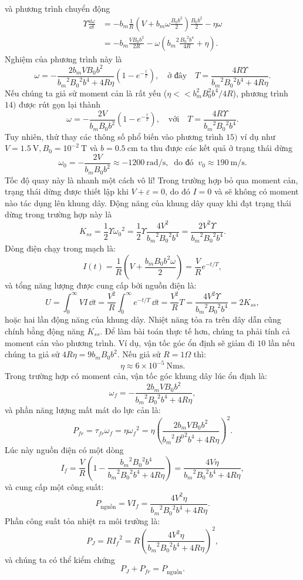 \begin{loigiai}
và phương trình chuyển động 
    \[\begin{aligned} \Upsilon \frac{\dd \omega}{\dd t} &= -b_m \frac{1}{R} \left(V + b_m \omega \frac{B_0 b^2}{2} \right) \frac{B_0 b^2}{2} -\eta \omega\\
      &= -b_m \frac{VB_0 b^2}{2R} - \omega\left({b_m}^2\frac{{B_0}^2 b^4}{4R} + \eta\right). \end{aligned} \tag{13} \]
Nghiệm của phương trình này là
      \[\omega= - \frac{2b_mVB_0 b^2}{{b_m}^2{B_0}^2 b^4 + 4R\eta}( 1- e^{-\frac{t}{T}}) ,  \quad   \text{ở đây}   \quad T= \frac{4R \Upsilon}{{b_m}^2 {B_0}^2b^4 +4R\eta}. \tag{14} \] 
Nếu chúng ta giả sử moment cản là rất yếu ($\eta << b_m^2 B_0^2 b^4/4R$), phương trình $14)$ được rút gọn lại thành 
     \[\omega = - \frac{2V}{b_m B_0 b^2}( 1 - e^{-\frac{t}{T}}),\quad \text{với} \quad T= \frac{4R\Upsilon}{{b_m}^2 {B_0}^2 b^4}. \tag{15} \]
Tuy nhiên, thử thay các thông số phổ biến vào phương trình $15)$ ví dụ như $V= 1.5 ~\mathrm{V}, B_0 = 10^{-2}~\mathrm{T}$ và $b=0.5~\mathrm{cm}$ ta thu được các kết quả ở trạng thái dừng
       \[ \omega_0 = -\frac{2V}{b_m B_0 b^2} \approx -1200 ~\mathrm{rad/s,}\ \text{ do đó }\ v_0 \approx 190 ~\mathrm{m/s}. \tag{16} \]
Tốc độ quay này là nhanh một cách vô lí! Trong trường hợp bỏ qua moment cản, trạng thái dừng được thiết lập khi $V+\varepsilon =0 $, do đó $I=0$ và sẽ không có moment nào tác dụng lên khung dây. Động năng của khung dây quay khi đạt trạng thái dừng trong trường hợp này là 
   \[K_{ss} =\frac{1}{2} \Upsilon {\omega_0}^2 = \frac{1}{2} \Upsilon \frac{4V^2}{{b_m}^2 {B_0}^2 b^4}= \frac{2V^2 \Upsilon}{{b_m}^2 {B_0}^2b^4} . \tag{17} \]
Dòng điện chạy trong mạch là: 
     \[ I(t) = \frac{1}{R} \left(V + \frac{b_m B_0 b^2 \omega}{2}\right) = \frac{V}{R}e^{-t/T}, \tag {18} \]
và tổng năng lượng được cung cấp bởi nguồn điện là:
     \[ U= \int_{0}^{\infty} VI \, \dd t = \frac{V^2}{R} \int_{0}^{\infty} e^{-t/T} \, \dd t = \frac{V^2}{R} T = \frac{4V^2 \Upsilon}{{b_m}^2 {B_0}^2 b^4 } = 2K_{ss}, \tag{19} \]
hoặc hai lần động năng của khung dây. Nhiệt năng tỏa ra trên dây dẫn cũng chính bằng động năng $K_{ss}$. Để làm bài toán thực tế hơn, chúng ta phải tính cả moment cản vào phương trình. Ví dụ, vận tốc góc ổn định sẽ giảm đi $10$ lần nếu chúng ta giả sử $4R\eta = 9b_m B_0 b^2$. Nếu giả sử $R  =1 \Omega $ thì:
     \[\eta \approx 6 \times 10^{-5} ~\mathrm{Nms}. \tag{20}\]
Trong trường hợp có moment cản, vận tốc góc khung dây lúc ổn định là: 
     \[ \omega_f = - \frac{2b_m V B_0 b^2}{{b_m}^2{B_0}^2 b^4 + 4R\eta}, \tag{21}\]
và phần năng lượng mất mát do lực cản là:
   \[P_{fr}=\tau_{fr}\omega_f = \eta {\omega_f}^2 =\eta \left( \frac{2b_m V B_0 b^2}{{b_m}^2 {B^0}^2 b^4 + 4R\eta}\right)^2. \tag{22}\]
Lúc này nguồn điện có một dòng 
    \[I_f = \frac{V}{R}\left(1 - \frac{{b_m}^2 {B_0}^2 b^4}{{b_m}^2 {B_0}^2 b^4 + 4R\eta}\right) = \frac{4V\eta}{{b_m}^2{B_0}^2 b^4 +4R\eta}, \tag{23} \]
và cung cấp một công suất: 
    \[P_{\text{nguồn}}=VI_f = \frac{4V^2\eta}{{b_m}^2{B_0}^2 b^4 +4R\eta}. \tag{24}\]
Phần công suất tỏa nhiệt ra môi trường là: 
  \[P_J = R{I_f}^2 = R \left(\frac{4V^2\eta}{{b_m}^2{B_0}^2 b^4 +4R\eta}\right)^2, \tag{25} \]
và chúng ta có thể kiểm chứng
  \[P_J +P_{fr} = P_{\text{nguồn}}.\]
 

\end{loigiai}


